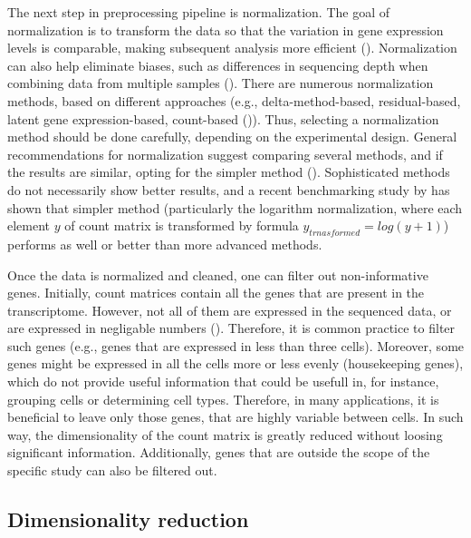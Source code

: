 The next step in preprocessing pipeline is normalization.
The goal of normalization is to transform the data so that the variation in gene expression levels is comparable,
making subsequent analysis more efficient (\cite{Ahlmann2023}).
Normalization can also help eliminate biases,
such as differences in sequencing depth when combining data from multiple samples (\cite{Lingen2024}).
There are numerous normalization methods, based on different approaches
(e.g., delta-method-based, residual-based, latent gene expression-based, count-based (\cite{Ahlmann2023})).
Thus, selecting a normalization method should be done carefully, depending on the experimental design.
General recommendations for normalization suggest comparing several methods,
and if the results are similar, opting for the simpler method (\cite{Lingen2024}).
Sophisticated methods do not necessarily show better results, and a recent benchmarking study by \textcite{Ahlmann2023}
has shown that simpler method (particularly the logarithm normalization,
where each element $y$ of count matrix is transformed by formula $y_{trnasformed} = log(y+1)$)
performs as well or better than more advanced methods.

Once the data is normalized and cleaned, one can filter out non-informative genes.
Initially, count matrices contain all the genes that are present in the transcriptome.
However, not all of them are expressed in the sequenced data, or are expressed in negligable numbers (\cite{Heumos2023}).
Therefore, it is common practice to filter such genes (e.g., genes that are expressed in less than three cells).
Moreover, some genes might be expressed in all the cells more or less evenly (housekeeping genes),
which do not provide useful information that could be usefull in, for instance, grouping cells or determining cell types.
Therefore, in many applications, it is beneficial to leave only those genes, that are highly variable between cells.
In such way, the dimensionality of the count matrix is greatly reduced without loosing significant information.
Additionally, genes that are outside the scope of the specific study can also be filtered out.

\subsection{Dimensionality reduction}
\label{sec:dimReduction}

